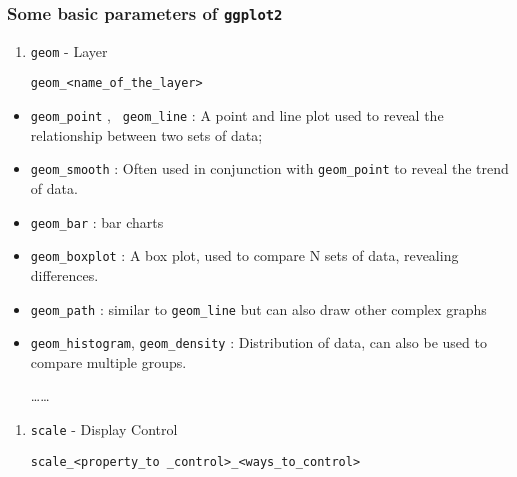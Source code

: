 \documentclass[
]{article}
\begin{document}
\hypertarget{some-basic-parameters-of-ggplot2}{%
\subsubsection{\texorpdfstring{Some basic parameters of
\texttt{ggplot2}}{Some basic parameters of ggplot2}}\label{some-basic-parameters-of-ggplot2}}

\begin{enumerate}
\def\labelenumi{\arabic{enumi}.}
\item
  \texttt{geom} - Layer

  \texttt{geom\_\textless{}name\_of\_the\_layer\textgreater{}}
\end{enumerate}

\begin{itemize}
\item
  \texttt{geom\_point} , \texttt{\textasciigrave{}\ geom\_line} : A
  point and line plot used to reveal the relationship between two sets
  of data;
\end{itemize}

\begin{itemize}
\item
  \texttt{geom\_smooth} : Often used in conjunction with
  \texttt{geom\_point} to reveal the trend of data.
\item
  \texttt{geom\_bar} : bar charts
\item
  \texttt{geom\_boxplot} : A box plot, used to compare N sets of data,
  revealing differences.
\item
  \texttt{geom\_path} : similar to \texttt{geom\_line} but can also draw
  other complex graphs
\item
  \texttt{geom\_histogram}, \texttt{geom\_density} : Distribution of
  data, can also be used to compare multiple groups.

  \ldots\ldots{}
\end{itemize}

\begin{enumerate}
\def\labelenumi{\arabic{enumi}.}
\item
  \texttt{scale} - Display Control

  \texttt{scale\_\textless{}property\_to\ \_control\textgreater{}\_\textless{}ways\_to\_control\textgreater{}}
\end{enumerate}
\end{document}
